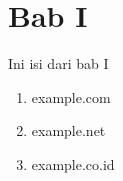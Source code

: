 \documentclass[a4paper, 12pt]{article}
\begin{document}
\section{Bab I}
Ini isi dari bab I
\begin{enumerate}

\item{ example.com }

\item{ example.net }

\item{ example.co.id }

\end{enumerate}
\end{document}
